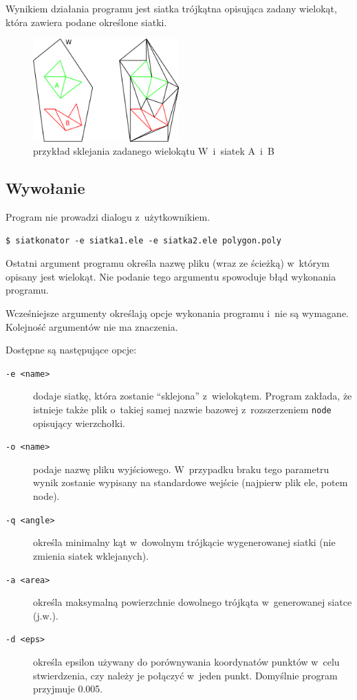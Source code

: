 \documentclass[a4paper]{article} \usepackage{setspace}
\begin{document}
Wynikiem działania programu jest siatka trójkątna opisująca zadany wielokąt, która zawiera podane określone siatki.

\begin{figure}[h]
  \centering
  \includegraphics[width=0.5\textwidth]{ilustracja.png}
  \caption{przykład sklejania zadanego wielokątu W~i~siatek A~i~B}
\end{figure}

\subsection{Wywołanie}
Program nie prowadzi dialogu z~użytkownikiem.

\begin{lstlisting}[caption=Przykładowe wywołanie]
  $ siatkonator -e siatka1.ele -e siatka2.ele polygon.poly
\end{lstlisting}

Ostatni argument programu określa nazwę pliku (wraz ze ścieżką) w~którym opisany jest wielokąt.
Nie podanie tego argumentu spowoduje błąd wykonania programu.

Wcześniejsze argumenty określają opcje wykonania programu i~nie są wymagane.
Kolejność argumentów nie ma znaczenia.

Dostępne są następujące opcje:
\begin{description}
  \item[\texttt{-e <name>}] dodaje siatkę, która zostanie ``sklejona'' z~wielokątem. Program zakłada, że istnieje także plik o~takiej samej nazwie bazowej z~rozszerzeniem \texttt{node} opisujący wierzchołki.
  \item[\texttt{-o <name>}] podaje nazwę pliku wyjściowego. W~przypadku braku tego parametru wynik zostanie wypisany na standardowe wejście (najpierw plik ele, potem node).
  \item[\texttt{-q <angle>}] określa minimalny kąt w~dowolnym trójkącie wygenerowanej siatki (nie zmienia siatek wklejanych).
  \item[\texttt{-a <area>}] określa maksymalną powierzchnie dowolnego trójkąta w~generowanej siatce (j.w.).
  \item[\texttt{-d <eps>}] określa epsilon używany do porównywania koordynatów punktów w~celu stwierdzenia, czy należy je połączyć w~jeden punkt. Domyślnie program przyjmuje 0.005.
\end{description}
\end{document}
